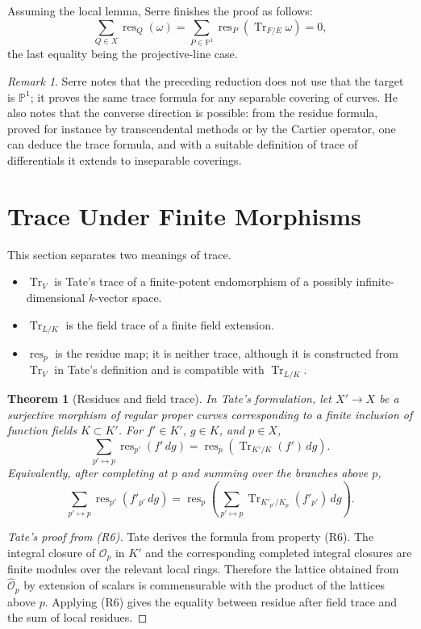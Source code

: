\documentclass[11pt,a4paper]{article}
\newcommand{\OO}{\mathcal O}
\newcommand{\wideO}{\widehat{\mathcal O}}
\newcommand{\res}{\operatorname{res}}
\newcommand{\Tr}{\operatorname{Tr}}
\theoremstyle{definition}
\theoremstyle{plain}
\newtheorem{theorem}[definition]{Theorem}
\theoremstyle{remark}
\newtheorem*{remark}{Remark}
\begin{document}
Assuming the local lemma, Serre finishes the proof as follows:
\[
  \sum_{Q\in X}\res_Q(\omega)
  =\sum_{P\in\mathbb P^1}\res_P(\Tr_{F/E}\omega)=0,
\]
the last equality being the projective-line case.

\begin{remark}
Serre notes that the preceding reduction does not use that the target is $\mathbb P^1$; it proves the same trace formula for any separable covering of curves.  He also notes that the converse direction is possible: from the residue formula, proved for instance by transcendental methods or by the Cartier operator, one can deduce the trace formula, and with a suitable definition of trace of differentials it extends to inseparable coverings.
\end{remark}

\section{Trace Under Finite Morphisms}

This section separates two meanings of trace.

\begin{itemize}
\item $\Tr_V$ is Tate's trace of a finite-potent endomorphism of a possibly infinite-dimensional $k$-vector space.
\item $\Tr_{L/K}$ is the field trace of a finite field extension.
\item $\res_p$ is the residue map; it is neither trace, although it is constructed from $\Tr_V$ in Tate's definition and is compatible with $\Tr_{L/K}$.
\end{itemize}

\begin{theorem}[Residues and field trace]
In Tate's formulation, let $X'\to X$ be a surjective morphism of regular proper curves corresponding to a finite inclusion of function fields $K\subset K'$.  For $f'\in K'$, $g\in K$, and $p\in X$,
\[
  \sum_{p'\mapsto p}\res_{p'}(f'\,dg)
  =\res_p(\Tr_{K'/K}(f')\,dg).
\]
Equivalently, after completing at $p$ and summing over the branches above $p$,
\[
  \sum_{p'\mapsto p}\res_{p'}(f'_{p'}\,dg)
  =\res_p\!\left(\sum_{p'\mapsto p}\Tr_{K'_{p'}/K_p}(f'_{p'})\,dg\right).
\]
\end{theorem}

\begin{proof}[Tate's proof from (R6)]
Tate derives the formula from property (R6).  The integral closure of $\OO_p$ in $K'$ and the corresponding completed integral closures are finite modules over the relevant local rings.  Therefore the lattice obtained from $\wideO_p$ by extension of scalars is commensurable with the product of the lattices above $p$.  Applying (R6) gives the equality between residue after field trace and the sum of local residues.
\end{proof}
\end{document}
